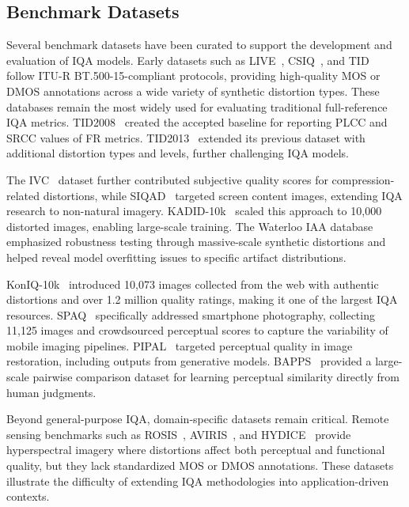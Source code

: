 \subsection{Benchmark Datasets}\label{sec:benchmark_datasets}

Several benchmark datasets have been curated to support the development and evaluation of \acs{IQA} models. Early datasets such as \acf{LIVE}~\cite{livewebsite, sheikh2005live, sheikh2006live}, \acf{CSIQ}~\cite{csiq}, and \acf{TID}~\cite{tid2008, tid2013} follow \acs{ITU-R BT.500-15}-compliant protocols, providing high-quality \acs{MOS} or \acs{DMOS} annotations across a wide variety of synthetic distortion types. These databases remain the most widely used for evaluating traditional full-reference \acs{IQA} metrics. \acf{TID}2008~\cite{tid2008} created the accepted baseline for reporting \acs{PLCC} and \acs{SRCC} values of \acs{FR} metrics. \acs{TID}2013~\cite{tid2013} extended its previous dataset with additional distortion types and levels, further challenging \acs{IQA} models.

The \acf{IVC}~\cite{ivc} dataset further contributed subjective quality scores for compression-related distortions, while \acf{SIQAD}~\cite{siqad} targeted screen content images, extending \acs{IQA} research to non-natural imagery. \acf{KADID-10k}~\cite{kadid10k} scaled this approach to 10{,}000 distorted images, enabling large-scale training. The Waterloo \acf{IAA} database~\cite{waterloo} emphasized robustness testing through massive-scale synthetic distortions and helped reveal model overfitting issues to specific artifact distributions.

\acf{KonIQ-10k}~\cite{koniq10k} introduced 10{,}073 images collected from the web with authentic distortions and over 1.2 million quality ratings, making it one of the largest \acs{IQA} resources. \acf{SPAQ}~\cite{spaq} specifically addressed smartphone photography, collecting 11{,}125 images and crowdsourced perceptual scores to capture the variability of mobile imaging pipelines. \acf{PIPAL}~\cite{pipal} targeted perceptual quality in image restoration, including outputs from generative models. \acf{BAPPS}~\cite{bapps} provided a large-scale pairwise comparison dataset for learning perceptual similarity directly from human judgments.

Beyond general-purpose \acs{IQA}, domain-specific datasets remain critical. Remote sensing benchmarks such as \acf{ROSIS}~\cite{rosis}, \acf{AVIRIS}~\cite{aviris}, and \acf{HYDICE}~\cite{hydice} provide hyperspectral imagery where distortions affect both perceptual and functional quality, but they lack standardized \acs{MOS} or \acs{DMOS} annotations. These datasets illustrate the difficulty of extending \acs{IQA} methodologies into application-driven contexts.

